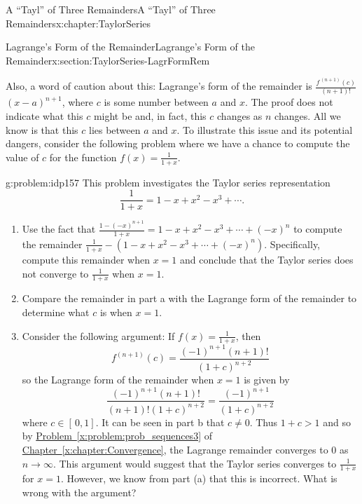 \begin{chapterptx}{A ``Tayl'' of Three Remainders}{}{A ``Tayl'' of Three Remainders}{}{}{x:chapter:TaylorSeries}
\begin{sectionptx}{Lagrange's Form of the Remainder}{}{Lagrange's Form of the Remainder}{}{}{x:section:TaylorSeries-LagrFormRem}
		\par
		Also, a word of caution about this: Lagrange's form of the remainder is \(\frac{f^{\,(n+1)}(c)}{(n+1)!}\) \((x-a)^{n+1}\), where \(c\) is some number between \(a\) and \(x\).  The proof does not indicate what this \(c\) might be and, in fact, this \(c\) changes as \(n\) changes. All we know is that this \(c\) lies between \(a\) and \(x\).  To illustrate this issue and its potential dangers, consider the following problem where we have a chance to compute the value of \(c\) for the function \(f(x)=\frac{1}{1+x}\).%
		\begin{problem}{}{g:problem:idp157}%
			This problem investigates the Taylor series representation%
			\begin{equation*}
				\frac{1}{1+x}=1-x+x^2-x^3+\cdots\text{.}
			\end{equation*}
			\begin{enumerate}[font=\bfseries,label=(\alph*),ref=\alph*]
				\item{}Use the fact that \(\frac{1-(-x)^{n+1}}{1+x}=1-x+x^2-x^3+\cdots+(-x)^n\) to compute the remainder \(\frac{1}{1+x}-\left(1-x+x^2-x^3+\cdots+(-x)^n\right)\). Specifically, compute this remainder when \(x=1\) and conclude that the Taylor series does not converge to \(\frac{1}{1+x}\) when \(x=1\).%
				\item{}Compare the remainder in part a with the Lagrange form of the remainder to determine what \(c\) is when \(x=1\).%
				\item{}Consider the following argument: If \(f(x)=\frac{1}{1+x}\), then%
				\begin{equation*}
					f^{(n+1)}(c)=\frac{(-1)^{n+1}(n+1)!}{(1+c)^{n+2}}
				\end{equation*}
				so the Lagrange form of the remainder when \(x=1\) is given by%
				\begin{equation*}
					\frac{(-1)^{n+1}(n+1)!}{(n+1)!(1+c)^{n+2}}=\frac{(-1)^{n+1}}{(1+c)^{n+2}}
				\end{equation*}
				where \(c\in[\,0,1]\).  It can be seen in part b that \(c\neq 0\).  Thus \(1+c>1\) and so by \hyperref[x:problem:prob_sequences3]{Problem~{\xreffont\ref{x:problem:prob_sequences3}}} of \hyperref[x:chapter:Convergence]{Chapter~{\xreffont\ref{x:chapter:Convergence}}}, the Lagrange remainder converges to \(0\) as \(n\rightarrow\infty\).  This argument would suggest that the Taylor series converges to \(\frac{1}{1+x}\) for \(x=1\).  However, we know from part (a) that this is incorrect.  What is wrong with the argument?%
			\end{enumerate}

\end{problem}
\end{sectionptx}
\end{chapterptx}
